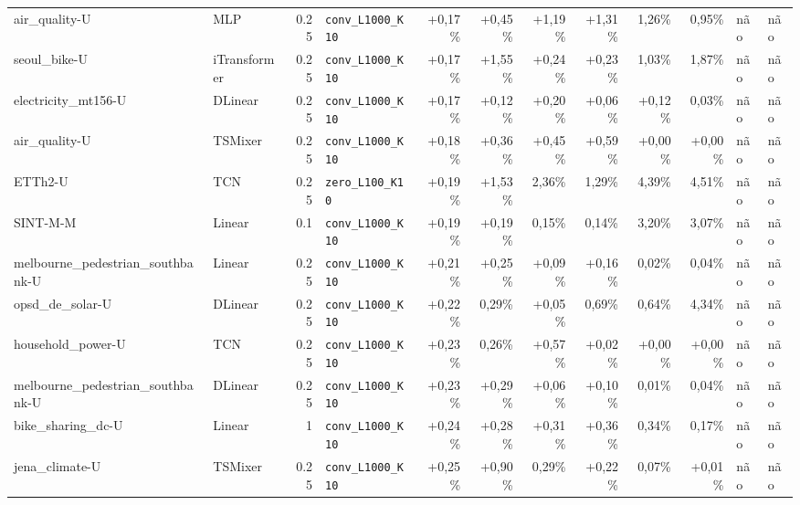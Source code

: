 \begin{longtable}{llrlrrrrrrll}
air\_quality-U & MLP & 0.25 & \texttt{conv\_\allowbreak{}L1000\_\allowbreak{}K10} & +0,17\% & +0,45\% & +1,19\% & +1,31\% & \textminus{}1,26\% & \textminus{}0,95\% & n\~ao & n\~ao \\
seoul\_bike-U & iTransformer & 0.25 & \texttt{conv\_\allowbreak{}L1000\_\allowbreak{}K10} & +0,17\% & +1,55\% & +0,24\% & +0,23\% & \textminus{}1,03\% & \textminus{}1,87\% & n\~ao & n\~ao \\
electricity\_mt156-U & DLinear & 0.25 & \texttt{conv\_\allowbreak{}L1000\_\allowbreak{}K10} & +0,17\% & +0,12\% & +0,20\% & +0,06\% & +0,12\% & \textminus{}0,03\% & n\~ao & n\~ao \\
air\_quality-U & TSMixer & 0.25 & \texttt{conv\_\allowbreak{}L1000\_\allowbreak{}K10} & +0,18\% & +0,36\% & +0,45\% & +0,59\% & +0,00\% & +0,00\% & n\~ao & n\~ao \\
ETTh2-U & TCN & 0.25 & \texttt{zero\_\allowbreak{}L100\_\allowbreak{}K10} & +0,19\% & +1,53\% & \textminus{}2,36\% & \textminus{}1,29\% & \textminus{}4,39\% & \textminus{}4,51\% & n\~ao & n\~ao \\
SINT-M-M & Linear & 0.1 & \texttt{conv\_\allowbreak{}L1000\_\allowbreak{}K10} & +0,19\% & +0,19\% & \textminus{}0,15\% & \textminus{}0,14\% & \textminus{}3,20\% & \textminus{}3,07\% & n\~ao & n\~ao \\
melbourne\_pedestrian\_southbank-U & Linear & 0.25 & \texttt{conv\_\allowbreak{}L1000\_\allowbreak{}K10} & +0,21\% & +0,25\% & +0,09\% & +0,16\% & \textminus{}0,02\% & \textminus{}0,04\% & n\~ao & n\~ao \\
opsd\_de\_solar-U & DLinear & 0.25 & \texttt{conv\_\allowbreak{}L1000\_\allowbreak{}K10} & +0,22\% & \textminus{}0,29\% & +0,05\% & \textminus{}0,69\% & \textminus{}0,64\% & \textminus{}4,34\% & n\~ao & n\~ao \\
household\_power-U & TCN & 0.25 & \texttt{conv\_\allowbreak{}L1000\_\allowbreak{}K10} & +0,23\% & \textminus{}0,26\% & +0,57\% & +0,02\% & +0,00\% & +0,00\% & n\~ao & n\~ao \\
melbourne\_pedestrian\_southbank-U & DLinear & 0.25 & \texttt{conv\_\allowbreak{}L1000\_\allowbreak{}K10} & +0,23\% & +0,29\% & +0,06\% & +0,10\% & \textminus{}0,01\% & \textminus{}0,04\% & n\~ao & n\~ao \\
bike\_sharing\_dc-U & Linear & 1 & \texttt{conv\_\allowbreak{}L1000\_\allowbreak{}K10} & +0,24\% & +0,28\% & +0,31\% & +0,36\% & \textminus{}0,34\% & \textminus{}0,17\% & n\~ao & n\~ao \\
jena\_climate-U & TSMixer & 0.25 & \texttt{conv\_\allowbreak{}L1000\_\allowbreak{}K10} & +0,25\% & +0,90\% & \textminus{}0,29\% & +0,22\% & \textminus{}0,07\% & +0,01\% & n\~ao & n\~ao \\

\end{longtable}
